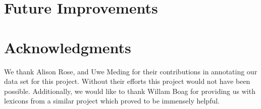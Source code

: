 \documentclass[11pt,letterpaper]{article}
\begin{document}
\section{Future Improvements}


\section*{Acknowledgments}
We thank Alison Rose, and Uwe Meding for their contributions in annotating our data set for this project. Without their efforts this project would not have been possible.
Additionally, we would like to thank Willam Boag for providing us with lexicons from a similar project which proved to be immensely helpful.





\end{document}
